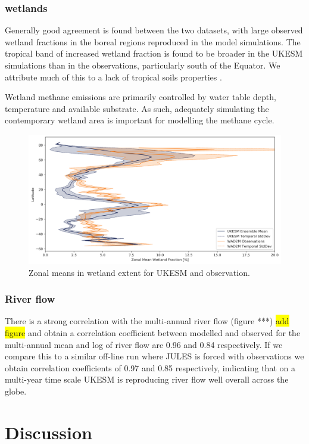 \documentclass[bg, manuscript]{copernicus}
\newcommand{\hilight}[1]{\colorbox{yellow}{#1}}
\begin{document}
\subsubsection{wetlands}
Generally good agreement is found between the two datasets, with large observed wetland fractions in the boreal regions reproduced in the model simulations. The tropical band of increased wetland fraction is found to be broader in the UKESM simulations than in the observations, particularly south of the Equator. We attribute much of this to a lack of tropical soils properties \citep{Gedney2019}.

Wetland methane emissions are primarily controlled by water table depth, temperature and available substrate. As such, adequately simulating the contemporary wetland area is important for modelling the methane cycle.  

\begin{figure}[t]
    \includegraphics[width=16cm]{figs/Wetland.png}
    \caption{Zonal means in wetland extent for UKESM and observation.  \label{fig:wetland} }
\end{figure}

\subsubsection{River flow}
There is a strong correlation with the multi-annual river flow (figure ***) \hilight{add figure} and obtain a correlation coefficient between modelled and observed for the multi-annual mean and log of river flow are 0.96 and 0.84 respectively. If we compare this to a similar off-line run where JULES is forced with observations we obtain correlation coefficients of 0.97 and 0.85 respectively, indicating that on a multi-year time scale UKESM is reproducing river flow well overall across the globe.

\section{Discussion}
\end{document}
